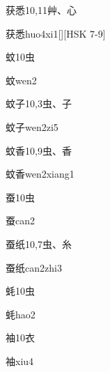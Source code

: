 \begin{Entry}{获悉}{10,11}{⾋、⼼}
  \begin{Phonetics}{获悉}{huo4xi1}[][HSK 7-9]
  \end{Phonetics}
\end{Entry}

\begin{Entry}{蚊}{10}{⾍}
  \begin{Phonetics}{蚊}{wen2}
  \end{Phonetics}
\end{Entry}

\begin{Entry}{蚊子}{10,3}{⾍、⼦}
  \begin{Phonetics}{蚊子}{wen2zi5}
  \end{Phonetics}
\end{Entry}

\begin{Entry}{蚊香}{10,9}{⾍、⾹}
  \begin{Phonetics}{蚊香}{wen2xiang1}
  \end{Phonetics}
\end{Entry}

\begin{Entry}{蚕}{10}{⾍}
  \begin{Phonetics}{蚕}{can2}
  \end{Phonetics}
\end{Entry}

\begin{Entry}{蚕纸}{10,7}{⾍、⽷}
  \begin{Phonetics}{蚕纸}{can2zhi3}
  \end{Phonetics}
\end{Entry}

\begin{Entry}{蚝}{10}{⾍}
  \begin{Phonetics}{蚝}{hao2}
  \end{Phonetics}
\end{Entry}

\begin{Entry}{袖}{10}{⾐}
  \begin{Phonetics}{袖}{xiu4}
  \end{Phonetics}
\end{Entry}


